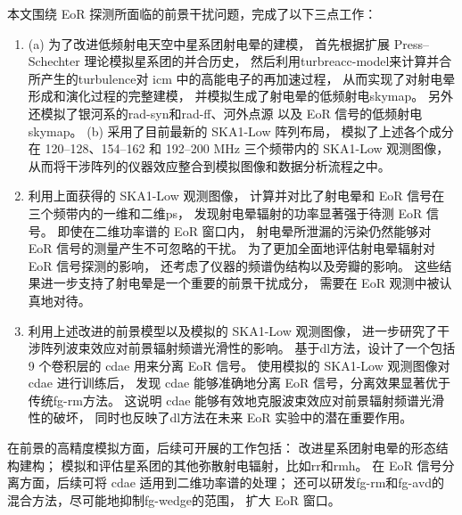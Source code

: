
\begin{summary}

本文围绕 EoR 探测所面临的前景干扰问题，完成了以下三点工作：
\begin{enumerate}
\item
(a) 为了改进低频射电天空中星系团射电晕的建模，
首先根据扩展 Press--Schechter 理论模拟星系团的并合历史，
然后利用\ac{turbreacc-model}来计算并合所产生的\ac{turbulence}对 \ac{icm}
中的高能电子的再加速过程，
从而实现了对射电晕形成和演化过程的完整建模，
并模拟生成了射电晕的低频射电\ac{skymap}。
另外还模拟了银河系的\ac{rad-syn}和\ac{rad-ff}、河外点源
以及 EoR 信号的低频射电\ac{skymap}。
(b) 采用了目前最新的 SKA1-Low 阵列布局，
模拟了上述各个成分在 \numrange{120}{128}、\numrange{154}{162}
和 \numrange{192}{200} \si{\MHz} 三个频带内的 SKA1-Low 观测图像，
从而将干涉阵列的仪器效应整合到模拟图像和数据分析流程之中。

\item
利用上面获得的 SKA1-Low 观测图像，
计算并对比了射电晕和 EoR 信号在三个频带内的一维和二维\ac{ps}，
发现射电晕辐射的功率显著强于待测 EoR 信号。
即使在二维功率谱的 EoR 窗口内，
射电晕所泄漏的污染仍然能够对 EoR 信号的测量产生不可忽略的干扰。
为了更加全面地评估射电晕辐射对 EoR 信号探测的影响，
还考虑了仪器的频谱伪结构以及旁瓣的影响。
这些结果进一步支持了射电晕是一个重要的前景干扰成分，
需要在 EoR 观测中被认真地对待。

\item
利用上述改进的前景模型以及模拟的 SKA1-Low 观测图像，
进一步研究了干涉阵列波束效应对前景辐射频谱光滑性的影响。
基于\ac{dl}方法，设计了一个包括 9 个卷积层的 \ac{cdae} 用来分离 EoR 信号。
使用模拟的 SKA1-Low 观测图像对 \ac{cdae} 进行训练后，
发现 \ac{cdae} 能够准确地分离 EoR 信号，分离效果显著优于传统\ac{fg-rm}方法。
这说明 \ac{cdae} 能够有效地克服波束效应对前景辐射频谱光滑性的破坏，
同时也反映了\ac{dl}方法在未来 EoR 实验中的潜在重要作用。
\end{enumerate}

在前景的高精度模拟方面，后续可开展的工作包括：
改进星系团射电晕的形态结构建构；
模拟和评估星系团的其他弥散射电辐射，比如\ac{rr}和\ac{rmh}。
在 EoR 信号分离方面，后续可将 \ac{cdae} 适用到二维功率谱的处理；
还可以研发\ac{fg-rm}和\ac{fg-avd}的混合方法，尽可能地抑制\ac{fg-wedge}的范围，
扩大 EoR 窗口。

\end{summary}
